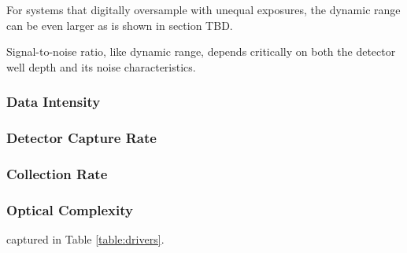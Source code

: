 \documentclass[10pt,journal]{IEEEtran}  %
\begin{document}
For systems that digitally oversample with unequal exposures, the dynamic range can be even larger as is shown in section TBD.

Signal-to-noise ratio, like dynamic range, depends critically on both the detector well depth and its noise characteristics.  

\subsubsection{Data Intensity}

\subsubsection{Detector Capture Rate}

\subsubsection{Collection Rate}

\subsubsection{Optical Complexity}

captured in Table \ref{table:drivers}.
\end{document}
